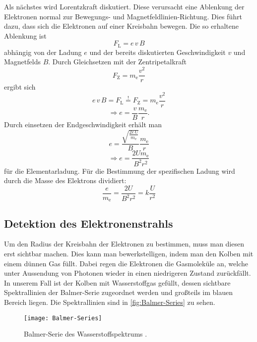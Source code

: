 Als nächstes wird Lorentzkraft diskutiert. Diese verursacht eine Ablenkung der Elektronen normal zur Bewegungs- und Magnetfeldlinien-Richtung. Dies führt dazu, dass sich die Elektronen auf einer Kreisbahn bewegen. Die so erhaltene Ablenkung ist 
$$F_\text{L} = e\, v\, B$$
abhängig von der Ladung $e$ und der bereits diskutierten Geschwindigkeit $v$ und Magnetfelds $B$. Durch Gleichsetzen mit der Zentripetalkraft
$$F_\text{Z} = m_{\text{e}}\frac{v^2}{r}$$
ergibt sich
$$e\,v\,B = F_\text{L} \stackrel{!}{=} F_\text{Z} = m_{\text{e}}\frac{v^2}{r}$$
$$\Rightarrow e = \frac{v}{B}\frac{m_{\text{e}}}{r}.$$
Durch einsetzen der Endgeschwindigkeit erhält man
$$e = \frac{\sqrt{\frac{2e\,U}{m_{\text{e}}}}}{B}\frac{m_{\text{e}}}{r}$$
\begin{equation}\label{eqn:e}
	\Rightarrow e = \frac{2Um_{\text{e}}}{B^2r^2}
\end{equation}
für die Elementarladung. Für die Bestimmung der spezifischen Ladung wird durch die Masse des Elektrons dividiert:
\begin{equation}\label{eqn:e/m}
	\frac{e}{m_{\text{e}}} = \frac{2U}{B^2r^2} = k\frac{U}{r^2}
\end{equation}

\subsection{Detektion des Elektronenstrahls}
Um den Radius der Kreisbahn der Elektronen zu bestimmen, muss man diesen erst sichtbar machen. Dies kann man bewerkstelligen, indem man den Kolben mit einem dünnen Gas füllt. Dabei regen die Elektronen die Gasmoleküle an, welche unter Aussendung von Photonen wieder in einen niedrigeren Zustand zurückfällt. In unserem Fall ist der Kolben mit Wasserstoffgas gefüllt, dessen sichtbare Spektrallinien der Balmer-Serie zugeordnet werden und großteils im blauen Bereich liegen. Die Spektrallinien sind in \autoref{fig:Balmer-Series} zu sehen.

\begin{figure}[H]
	\texttt{[image: Balmer-Series]}
	\caption{Balmer-Serie des Wasserstoffspektrums \cite{wiki:Balmer}.}
	\label{fig:Balmer-Series}
\end{figure}

